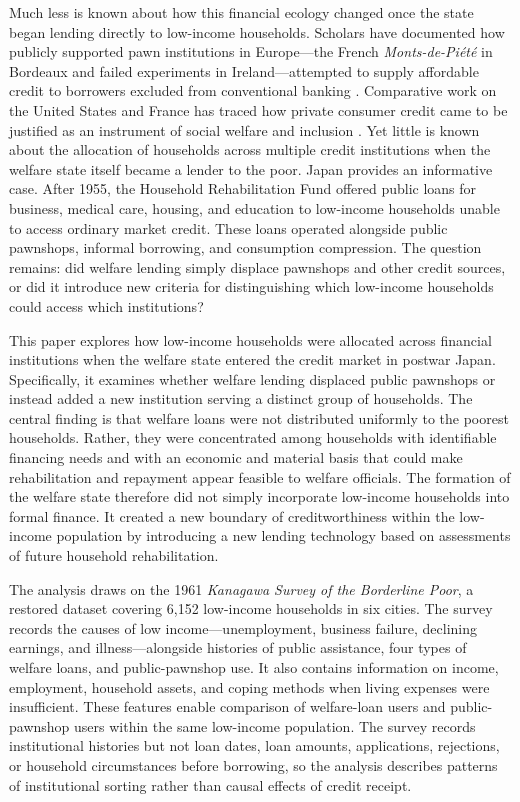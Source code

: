 \documentclass[12pt,a4paper]{article}
\begin{document}
Much less is known about how this financial ecology changed once the state began lending directly to low-income households. Scholars have documented how publicly supported pawn institutions in Europe—the French \emph{Monts-de-Piété} in Bordeaux and failed experiments in Ireland—attempted to supply affordable credit to borrowers excluded from conventional banking \citep{McLaughlin2013, PastureaBlancheton2014}. Comparative work on the United States and France has traced how private consumer credit came to be justified as an instrument of social welfare and inclusion \citep{Trumbull2012}. Yet little is known about the allocation of households across multiple credit institutions when the welfare state itself became a lender to the poor. Japan provides an informative case. After 1955, the Household Rehabilitation Fund offered public loans for business, medical care, housing, and education to low-income households unable to access ordinary market credit. These loans operated alongside public pawnshops, informal borrowing, and consumption compression. The question remains: did welfare lending simply displace pawnshops and other credit sources, or did it introduce new criteria for distinguishing which low-income households could access which institutions?

This paper explores how low-income households were allocated across financial institutions when the welfare state entered the credit market in postwar Japan. Specifically, it examines whether welfare lending displaced public pawnshops or instead added a new institution serving a distinct group of households. The central finding is that welfare loans were not distributed uniformly to the poorest households. Rather, they were concentrated among households with identifiable financing needs and with an economic and material basis that could make rehabilitation and repayment appear feasible to welfare officials. The formation of the welfare state therefore did not simply incorporate low-income households into formal finance. It created a new boundary of creditworthiness within the low-income population by introducing a new lending technology based on assessments of future household rehabilitation.

The analysis draws on the 1961 \emph{Kanagawa Survey of the Borderline Poor}, a restored dataset covering 6,152 low-income households in six cities. The survey records the causes of low income—unemployment, business failure, declining earnings, and illness—alongside histories of public assistance, four types of welfare loans, and public-pawnshop use. It also contains information on income, employment, household assets, and coping methods when living expenses were insufficient. These features enable comparison of welfare-loan users and public-pawnshop users within the same low-income population. The survey records institutional histories but not loan dates, loan amounts, applications, rejections, or household circumstances before borrowing, so the analysis describes patterns of institutional sorting rather than causal effects of credit receipt.
\end{document}
